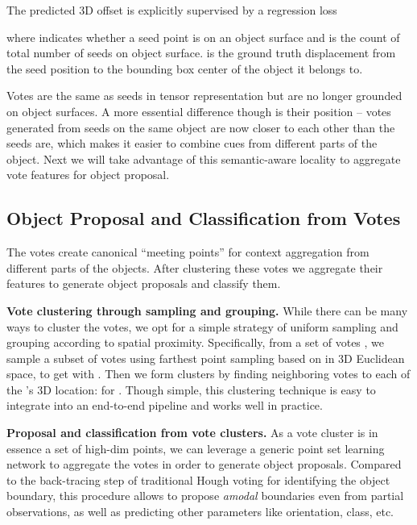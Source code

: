 \documentclass[10pt,twocolumn,letterpaper]{article}
\begin{document}
The predicted 3D offset  is explicitly supervised by a regression loss


\noindent
where  indicates whether a seed point  is on an object surface and  is the count of total number of seeds on object surface.  is the ground truth displacement from the seed position  to the bounding box center of the object it belongs to. 



Votes are the same as seeds in tensor representation but are no longer grounded on object surfaces. A more essential difference though is their position -- votes generated from seeds on the same object are now closer to each other than the seeds are, which makes it easier to combine cues from different parts of the object. Next we will take advantage of this semantic-aware locality to aggregate vote features for object proposal.







\subsection{Object Proposal and Classification from Votes}
\label{sec:votingnet:pooling}



The votes create canonical ``meeting points'' for context aggregation from different parts of the objects. After clustering these votes we aggregate their features to generate object proposals and classify them. 

\smallskip\noindent\textbf{Vote clustering through sampling and grouping.}
While there can be many ways to cluster the votes, we opt for a simple strategy of uniform sampling and grouping according to spatial proximity. Specifically, from a set of votes , we sample a subset of  votes using farthest point sampling based on  in 3D Euclidean space, to get  with . Then we form  clusters by finding neighboring votes to each of the 's 3D location:  for . Though simple, this clustering technique is easy to integrate into an end-to-end pipeline and works well in practice.

\smallskip\noindent\textbf{Proposal and classification from vote clusters.}
As a vote cluster is in essence a set of high-dim points, we can leverage a generic point set learning network to aggregate the votes in order to generate object proposals. Compared to the back-tracing step of traditional Hough voting for identifying the object boundary, this procedure allows to propose \textit{amodal} boundaries even from partial observations, as well as predicting other parameters like orientation, class, etc.  
\end{document}
